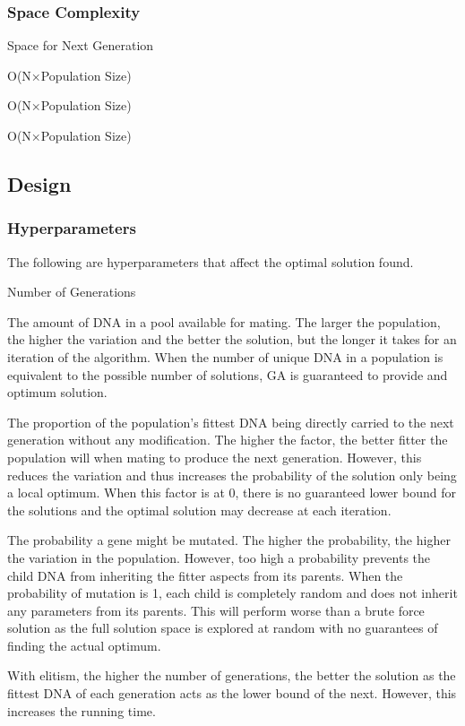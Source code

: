 \documentclass[sigconf]{acmart}
\begin{document}
\subsubsection{Space Complexity}
\begin{labeling}{Space for Next Generation\quad}
  \item[Space for Population] O(N×Population Size)
  \item[Space for Next Generation] O(N×Population Size)
  \item[Total Space Complexity] O(N×Population Size)
\end{labeling}

\subsection{Design}
\subsubsection{Hyperparameters}
The following are hyperparameters that affect the optimal solution found.
\begin{labeling}{Number of Generations\quad}
  \item[Population Size] The amount of DNA in a pool available for mating. The larger the population, the higher the variation and the better the solution, but the longer it takes for an iteration of the algorithm. When the number of unique DNA in a population is equivalent to the possible number of solutions, GA is guaranteed to provide and optimum solution.
  \item[Elitism Factor] The proportion of the population’s fittest DNA being directly carried to the next generation without any modification. The higher the factor, the better fitter the population will when mating to produce the next generation. However, this reduces the variation and thus increases the probability of the solution only being a local optimum. When this factor is at 0, there is no guaranteed lower bound for the solutions and the optimal solution may decrease at each iteration.
  \item[Mutation Probability] The probability a gene might be mutated. The higher the probability, the higher the variation in the population. However, too high a probability prevents the child DNA from inheriting the fitter aspects from its parents. When the probability of mutation is 1, each child is completely random and does not inherit any parameters from its parents. This will perform worse than a brute force solution as the full solution space is explored at random with no guarantees of finding the actual optimum.
  \item[Number of Generations] With elitism, the higher the number of generations, the better the solution as the fittest DNA of each generation acts as the lower bound of the next. However, this increases the running time.
\end{labeling}
\end{document}
